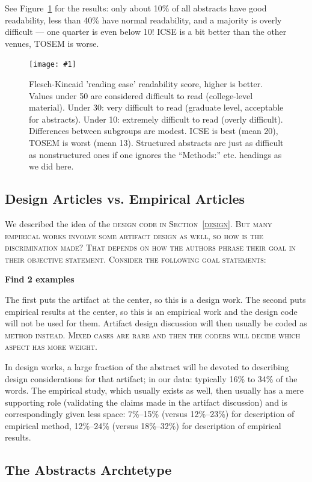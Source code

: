 \documentclass[10pt,journal,compsoc]{IEEEtran}
\newcommand{\Plot}[2]{%
	\begin{figure}[htb]%
		\centering\texttt{[image: \#1]}%
		\vspace{-4mm}\caption{#2}\label{#1}%
	\end{figure}}
\newcommand{\Cb}[1]{\bgroup\scshape #1\egroup}  %
\newcommand{\Todo}[1]{\bgroup\bfseries\Large #1\egroup}
\begin{document}
See Figure~\ref{boxplots_fkscore} for the results:
only about 10\% of all abstracts have good readability,
less than 40\% have normal readability,
and a majority is overly difficult --- one quarter is even below 10!
ICSE is a bit better than the other venues,
TOSEM is worse.

\Plot{boxplots_fkscore}{%
	Flesch-Kincaid 'reading ease' readability score, higher is better.
    Values under 50 are considered difficult to read (college-level material).
    Under 30: very difficult to read (graduate level, acceptable for abstracts).
	Under 10: extremely difficult to read (overly difficult).
    Differences between subgroups are modest. 
	ICSE is best (mean 20), TOSEM is worst (mean 13).
    Structured abstracts are just as difficult as nonstructured ones
    if one ignores the ``Methods:'' etc. headings as we did here.
}


\subsection{Design Articles vs. Empirical Articles}

We described the idea of the \Cb{design} code in Section~\ref{design}.
But many empirical works involve some artifact design as well,
so how is the discrimination made?
That depends on how the authors phrase their goal in their
\Cb{objective} statement.
Consider the following goal statements:

\Todo{Find 2 examples}

The first puts the artifact at the center, so this is a design work.
The second puts empirical results at the center, so this is an empirical work
and the design code will not be used for them.
Artifact design discussion will then usually be coded as \Cb{method} instead. 
Mixed cases are rare and then the coders will decide which aspect has more weight.

In design works, a large fraction of the abstract will be devoted to
describing design considerations for that artifact;
in our data: typically 16\% to 34\% of the words.
The empirical study, which usually exists as well, then usually has a mere 
supporting role (validating the claims made in the artifact discussion)
and is correspondingly given less space: 
7\%--15\% (versus 12\%--23\%) for description of empirical method,
12\%--24\% (versus 18\%--32\%) for description of empirical results.


\subsection{The Abstracts Archtetype}
\end{document}
